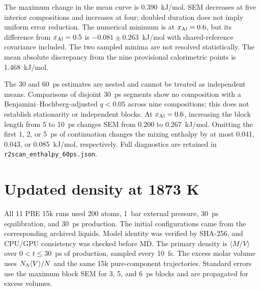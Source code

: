 \documentclass[10pt]{article}
\begin{document}
The maximum change in the mean curve is 0.390~kJ/mol. SEM decreases at five interior compositions and increases at four; doubled duration does not imply uniform error reduction. The numerical minimum is at $x_{\rm Al}=0.6$, but its difference from $x_{\rm Al}=0.5$ is $-0.081\pm0.263$~kJ/mol with shared-reference covariance included. The two sampled minima are not resolved statistically. The mean absolute discrepancy from the nine provisional calorimetric points is 1.468~kJ/mol.

The 30 and 60~ps estimates are nested and cannot be treated as independent means. Comparisons of disjoint 30~ps segments show no composition with a Benjamini--Hochberg-adjusted $q<0.05$ across nine compositions; this does not establish stationarity or independent blocks. At $x_{\rm Al}=0.6$, increasing the block length from 5 to 10~ps changes SEM from 0.200 to 0.267~kJ/mol. Omitting the first 1, 2, or 5~ps of continuation changes the mixing enthalpy by at most 0.041, 0.043, or 0.085~kJ/mol, respectively. Full diagnostics are retained in \texttt{r2scan\_enthalpy\_60ps.json}.

\section{Updated density at 1873 K}
All 11 PBE 15k runs used 200 atoms, 1~bar external pressure, 30~ps equilibration, and 30~ps production. The initial configurations came from the corresponding archived liquids. Model identity was verified by SHA-256, and CPU/GPU consistency was checked before MD. The primary density is $\langle M/V\rangle$ over $0<t\leq30$~ps of production, sampled every 10~fs. The excess molar volume uses $N_{\rm A}\langle V\rangle/N$ and the same 15k pure-component trajectories. Standard errors use the maximum block SEM for 3, 5, and 6~ps blocks and are propagated for excess volumes.
\end{document}
